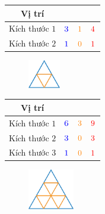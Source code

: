 \begin{multicols}{2}
	\begin{table}[H]
		\setlength{\tabcolsep}{2pt}
		\renewcommand{\arraystretch}{1.3}
		\begin{tabular}{|c|c|c|c|}
			\hline
			Vị trí & {\color{blue}{Lên}}  & {\color{orange}{Xuống}} & {\color{red}{Tổng}}\\
			\hline
			Kích thước $1$ & ${\color{blue}{3}}$ &${\color{orange}{1}}$ & ${\color{red}{4}}$\\
			\hline
			Kích thước $2$ & ${\color{blue}{1}}$ & ${\color{orange}{0}}$ & ${\color{red}{1}}$ \\
			\hline
		\end{tabular}
	\end{table}
	\begin{figure}[H]
		\vspace*{-5pt}
		\centering
		\captionsetup{labelformat= empty, justification=centering}
		\includegraphics[width=0.125\textwidth]{Hinh23_1.png}
		\caption{}
		\vspace*{-5pt}
	\end{figure}
\end{multicols}
\begin{multicols}{2}
	\begin{table}[H]
		\setlength{\tabcolsep}{2pt}
		\renewcommand{\arraystretch}{1.3}
		\begin{tabular}{|c|c|c|c|}
			\hline
			Vị trí & {\color{blue}{Lên}}  & {\color{orange}{Xuống}} & {\color{red}{Tổng}}\\
			\hline
			Kích thước $1$  & ${\color{blue}{6}}$ &${\color{orange}{ 3}}$ &${\color{red}{9}}$ \\
			\hline
			Kích thước $2$  & ${\color{blue}{3}}$ & ${\color{orange}{0}}$ & ${\color{red}{3}}$ \\
			\hline
			Kích thước $3$  & ${\color{blue}{1}}$ & ${\color{orange}{0}}$ & ${\color{red}{1}}$ \\
			\hline
		\end{tabular}
	\end{table}
	\begin{figure}[H]
		\centering
		\captionsetup{labelformat= empty, justification=centering}
		\includegraphics[width=0.18\textwidth]{Hinh24_1.png}
		\caption{}
		\vspace*{-10pt}
	\end{figure}
\end{multicols}
